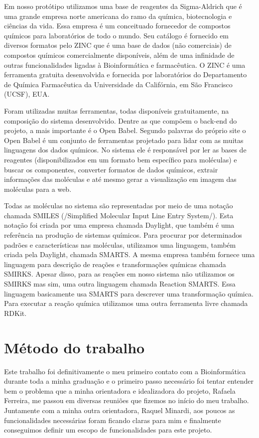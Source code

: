 \documentclass{abnt}
\begin{document}
Em nosso protótipo utilizamos uma base de reagentes da Sigma-Aldrich que é uma grande empresa norte americana do ramo da química, biotecnologia e ciências da vida. Essa empresa é um conceituado fornecedor de compostos químicos para laboratórios de todo o mundo. Seu catálogo é fornecido em diversos formatos pelo ZINC que é uma base de dados (não comerciais) de compostos químicos comercialmente disponíveis, além de uma infinidade de outras funcionalidades ligadas à Bioinformática e farmacêutica. O ZINC é uma ferramenta gratuita desenvolvida e fornecida por laboratórios do Departamento de Química Farmacêutica da Universidade da Califórnia, em São Francisco (UCSF), EUA.

Foram utilizadas muitas ferramentas, todas disponíveis gratuitamente, na composição do sistema desenvolvido. Dentre as que compõem o back-end do projeto, a mais importante é o Open Babel. Segundo palavras do próprio site o Open Babel é um conjunto de ferramentas projetado para lidar com as muitas linguagens dos dados químicos. No sistema ele é responsável por ler as bases de reagentes (disponibilizados em um formato bem específico para moléculas) e buscar os componentes, converter formatos de dados químicos, extrair informações das moléculas e até mesmo gerar a visualização em imagem das moléculas para a web.

Todas as moléculas no sistema são representadas por meio de uma notação chamada SMILES (/Simplified Molecular Input Line Entry System/). Esta notação foi criada por uma empresa chamada Daylight, que também é uma referência na produção de sistemas químicos. Para procurar por determinados padrões e características nas moléculas, utilizamos uma linguagem, também criada pela Daylight, chamada SMARTS. A mesma empresa também fornece uma linguagem para descrição de reações e transformações químicas chamada SMIRKS. Apesar disso, para as reações em nosso sistema não utilizamos os SMIRKS mas sim, uma outra linguagem chamada Reaction SMARTS. Essa linguagem basicamente usa SMARTS para descrever uma transformação química. Para executar a reação química utilizamos uma outra ferramenta livre chamada RDKit.

\chapter{Método do trabalho}

Este trabalho foi definitivamente o meu primeiro contato com a Bioinformática durante toda a minha graduação e o primeiro passo necessário foi tentar entender bem o problema que a minha orientadora e idealizadora do projeto, Rafaela Ferreira, me passou em diversas reuniões que fizemos no início do meu trabalho. Juntamente com a minha outra orientadora, Raquel Minardi, aos poucos as funcionalidades necessárias foram ficando claras para mim e finalmente conseguimos definir um escopo de funcionalidades para este projeto.
\end{document}
